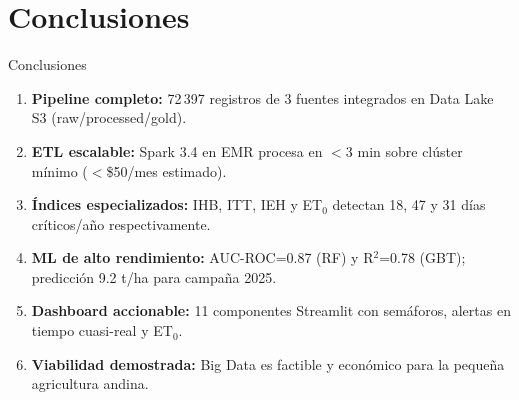 \documentclass[14pt,aspectratio=169]{beamer}
\begin{document}
\section{Conclusiones}

\begin{frame}{Conclusiones}
  \begin{enumerate}
    \item \textbf{Pipeline completo:} 72\,397 registros de 3 fuentes
      integrados en Data Lake S3 (raw/processed/gold).

    \vspace{0.2em}
    \item \textbf{ETL escalable:} Spark 3.4 en EMR procesa en $<$3 min
      sobre cl\'uster m\'inimo ($<$\$50/mes estimado).

    \vspace{0.2em}
    \item \textbf{\'Indices especializados:} IHB, ITT, IEH y ET$_0$
      detectan 18, 47 y 31 d\'ias cr\'iticos/a\~no respectivamente.

    \vspace{0.2em}
    \item \textbf{ML de alto rendimiento:} AUC-ROC=0.87 (RF) y
      R$^2$=0.78 (GBT); predicci\'on 9.2 t/ha para campa\~na 2025.

    \vspace{0.2em}
    \item \textbf{Dashboard accionable:} 11 componentes Streamlit
      con sem\'aforos, alertas en tiempo cuasi-real y ET$_0$.

    \vspace{0.2em}
    \item \textbf{Viabilidad demostrada:} Big Data es factible y
      econ\'omico para la peque\~na agricultura andina.
  \end{enumerate}
\end{frame}
\end{document}
